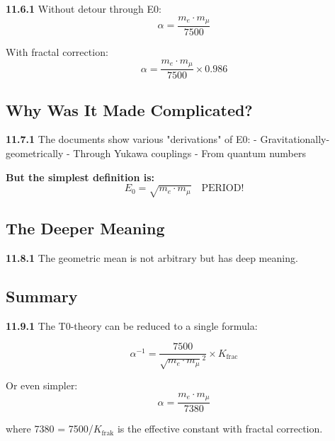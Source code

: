 \documentclass[12pt,a4paper]{article}
\newcommand{\kfrac}{K_{\text{frak}}}
\begin{document}
\begin{tcolorbox}[colback=green!5!white,colframe=green!75!black,title=\textbf{The Most Direct Formula}]
	\noindent \textbf{11.6.1} Without detour through E0:
	\begin{equation}
		\boxed{\alpha = \frac{m_e \cdot m_\mu}{7500}}
	\end{equation}
	
	With fractal correction:
	\begin{equation}
		\boxed{\alpha = \frac{m_e \cdot m_\mu}{7500} \times 0.986}
	\end{equation}
\end{tcolorbox}

\subsection{Why Was It Made Complicated?}

\noindent \textbf{11.7.1} The documents show various "derivations" of E0:
- Gravitationally-geometrically
- Through Yukawa couplings
- From quantum numbers

\textbf{But the simplest definition is:}
\begin{equation}
	\boxed{E_0 = \sqrt{m_e \cdot m_\mu} \quad \text{PERIOD!}}
\end{equation}

\subsection{The Deeper Meaning}

\noindent \textbf{11.8.1} The geometric mean is not arbitrary but has deep meaning.

\subsection{Summary}

\begin{tcolorbox}[colback=blue!5!white,colframe=blue!75!black,title=\textbf{The Essence}]
	\noindent \textbf{11.9.1} The T0-theory can be reduced to a single formula:
	
	\begin{equation}
		\boxed{\alpha^{-1} = \frac{7500}{\sqrt{m_e \cdot m_\mu}^2} \times K_{\text{frac}}}
	\end{equation}
	
	Or even simpler:
	\begin{equation}
		\boxed{\alpha = \frac{m_e \cdot m_\mu}{7380}}
	\end{equation}
	
	where 7380 = 7500/$\kfrac$ is the effective constant with fractal correction.
\end{tcolorbox}
\end{document}
